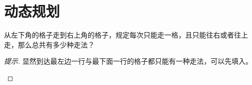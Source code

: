 
\chapter{动态规划}
\label{chap:dynamic-programming}

\begin{example}
  从左下角的格子走到右上角的格子，规定每次只能走一格，且只能往右或者往上走，那么总共有多少种走法？
  \begin{center}
  \end{center}
\end{example}
\begin{proof}[提示]
  显然到达最左边一行与最下面一行的格子都只能有一种走法，可以先填入。
  \begin{center}
  \end{center}


\end{proof}
